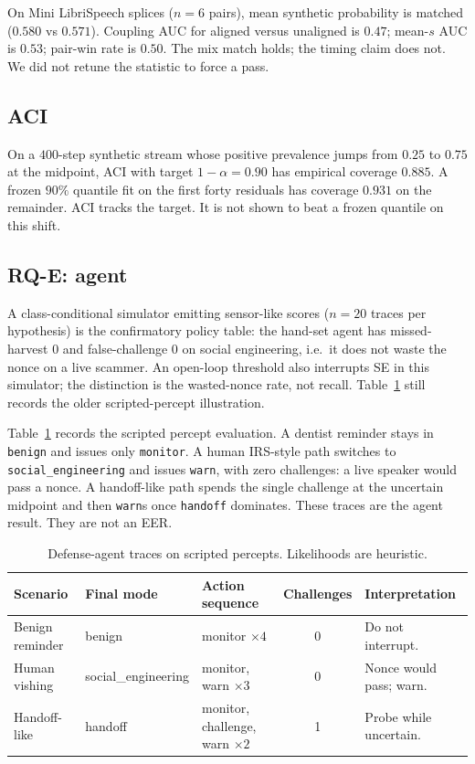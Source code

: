 \documentclass[11pt]{article}
\begin{document}
On Mini LibriSpeech splices ($n{=}6$ pairs), mean synthetic probability is matched ($0.580$ vs $0.571$). Coupling AUC for aligned versus unaligned is $0.47$; mean-$s$ AUC is $0.53$; pair-win rate is $0.50$. The mix match holds; the timing claim does not. We did not retune the statistic to force a pass.

\subsection{ACI}
On a $400$-step synthetic stream whose positive prevalence jumps from $0.25$ to $0.75$ at the midpoint, ACI with target $1-\alpha=0.90$ has empirical coverage $0.885$. A frozen $90\%$ quantile fit on the first forty residuals has coverage $0.931$ on the remainder. ACI tracks the target. It is not shown to beat a frozen quantile on this shift.

\subsection{RQ-E: agent}
A class-conditional simulator emitting sensor-like scores ($n{=}20$ traces per hypothesis) is the confirmatory policy table: the hand-set agent has missed-harvest $0$ and false-challenge $0$ on social engineering, i.e.\ it does not waste the nonce on a live scammer. An open-loop threshold also interrupts SE in this simulator; the distinction is the wasted-nonce rate, not recall. Table~\ref{tab:agent} still records the older scripted-percept illustration.

Table~\ref{tab:agent} records the scripted percept evaluation. A dentist reminder stays in \texttt{benign} and issues only \texttt{monitor}. A human IRS-style path switches to \texttt{social\_engineering} and issues \texttt{warn}, with zero challenges: a live speaker would pass a nonce. A handoff-like path spends the single challenge at the uncertain midpoint and then \texttt{warn}s once \texttt{handoff} dominates. These traces are the agent result. They are not an EER.

\begin{table}[t]
\centering
\caption{Defense-agent traces on scripted percepts. Likelihoods are heuristic.}
\label{tab:agent}
\begin{tabular}{lllcl}
\toprule
Scenario & Final mode & Action sequence & Challenges & Interpretation \\
\midrule
Benign reminder & benign & monitor $\times 4$ & 0 & Do not interrupt. \\
Human vishing & social\_engineering & monitor, warn $\times 3$ & 0 & Nonce would pass; warn. \\
Handoff-like & handoff & monitor, challenge, warn $\times 2$ & 1 & Probe while uncertain. \\
\bottomrule
\end{tabular}
\end{table}
\end{document}
